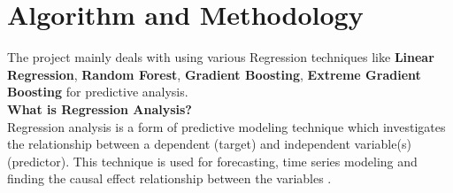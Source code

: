 \documentclass[fleqn,10pt]{SelfArx} %
\begin{document}
\section{Algorithm and Methodology}
The project mainly deals with using various Regression techniques like \textbf{Linear Regression}, \textbf{Random Forest}, \textbf{Gradient Boosting}, \textbf{Extreme Gradient Boosting} for predictive analysis.
\\ \textbf{What is Regression Analysis?}
\\ Regression analysis is a form of predictive modeling technique which investigates the relationship between a dependent (target) and independent variable(s) (predictor). This technique is used for forecasting, time series modeling and finding the causal effect relationship between the variables \cite{REF:2}. 
\end{document}
